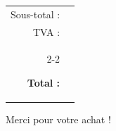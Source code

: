 \documentclass[11pt,a4paper]{article}
\begin{document}
\InvoiceTable
{
}
{
}



\vspace{1cm}

\begin{flushright}

\begin{tabular}{rl}

Sous-total :
&
\\[2mm]

TVA :
&
\\[2mm]

\cline{2-2}

\textbf{\large Total :}
&
\textbf{\large
}

\end{tabular}

\end{flushright}


\vfill



\begin{center}

    \color{darkgray}
    Merci pour votre achat !

\end{center}
\end{document}
